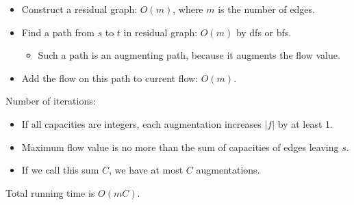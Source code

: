 \begin{itemize}
	\item Construct a residual graph: $O(m)$, where $m$ is the number of edges.
	\item Find a path from $s$ to $t$ in residual graph: $O(m)$ by dfs or bfs.
	\begin{itemize}
		\item Such a path is an augmenting path, because it augments the flow value.
	\end{itemize}
	\item Add the flow on this path to current flow: $O(m)$.
\end{itemize}

Number of iterations:
\begin{itemize}
	\item If all capacities are integers, each augmentation increases $|f|$ by at least 1.
	\item Maximum flow value is no more than the sum of capacities of edges leaving $s$.
	\item If we call this sum $C$, we have at most $C$ augmentations.
\end{itemize}

Total running time is $O(mC)$.










